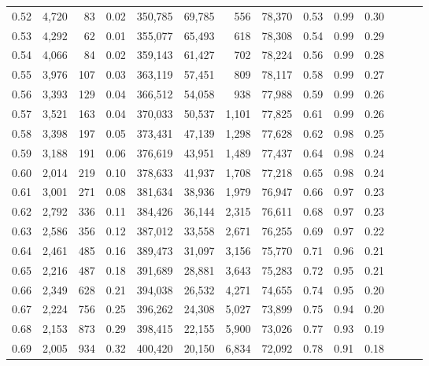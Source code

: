 \begin{tabular}{rrrrrrrrrrrrrr}
0.52 &   4,720 &     83 &  0.02 &  350,785 &   69,785 &     556 &  78,370 &  0.53 &  0.99 &      0.30 \\
0.53 &   4,292 &     62 &  0.01 &  355,077 &   65,493 &     618 &  78,308 &  0.54 &  0.99 &      0.29 \\
0.54 &   4,066 &     84 &  0.02 &  359,143 &   61,427 &     702 &  78,224 &  0.56 &  0.99 &      0.28 \\
0.55 &   3,976 &    107 &  0.03 &  363,119 &   57,451 &     809 &  78,117 &  0.58 &  0.99 &      0.27 \\
0.56 &   3,393 &    129 &  0.04 &  366,512 &   54,058 &     938 &  77,988 &  0.59 &  0.99 &      0.26 \\
0.57 &   3,521 &    163 &  0.04 &  370,033 &   50,537 &   1,101 &  77,825 &  0.61 &  0.99 &      0.26 \\
0.58 &   3,398 &    197 &  0.05 &  373,431 &   47,139 &   1,298 &  77,628 &  0.62 &  0.98 &      0.25 \\
0.59 &   3,188 &    191 &  0.06 &  376,619 &   43,951 &   1,489 &  77,437 &  0.64 &  0.98 &      0.24 \\
0.60 &   2,014 &    219 &  0.10 &  378,633 &   41,937 &   1,708 &  77,218 &  0.65 &  0.98 &      0.24 \\
0.61 &   3,001 &    271 &  0.08 &  381,634 &   38,936 &   1,979 &  76,947 &  0.66 &  0.97 &      0.23 \\
0.62 &   2,792 &    336 &  0.11 &  384,426 &   36,144 &   2,315 &  76,611 &  0.68 &  0.97 &      0.23 \\
0.63 &   2,586 &    356 &  0.12 &  387,012 &   33,558 &   2,671 &  76,255 &  0.69 &  0.97 &      0.22 \\
0.64 &   2,461 &    485 &  0.16 &  389,473 &   31,097 &   3,156 &  75,770 &  0.71 &  0.96 &      0.21 \\
0.65 &   2,216 &    487 &  0.18 &  391,689 &   28,881 &   3,643 &  75,283 &  0.72 &  0.95 &      0.21 \\
0.66 &   2,349 &    628 &  0.21 &  394,038 &   26,532 &   4,271 &  74,655 &  0.74 &  0.95 &      0.20 \\
0.67 &   2,224 &    756 &  0.25 &  396,262 &   24,308 &   5,027 &  73,899 &  0.75 &  0.94 &      0.20 \\
0.68 &   2,153 &    873 &  0.29 &  398,415 &   22,155 &   5,900 &  73,026 &  0.77 &  0.93 &      0.19 \\
0.69 &   2,005 &    934 &  0.32 &  400,420 &   20,150 &   6,834 &  72,092 &  0.78 &  0.91 &      0.18 \\

\end{tabular}
